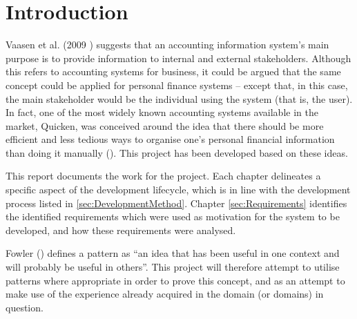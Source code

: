 \section{Introduction} \label{sec:Introduction}

Vaasen et al. (2009 \cite[cited][p.~8]{Boczko:2012:IAI:2331376}) suggests that
an accounting information system's main purpose is to provide information to
internal and external stakeholders. Although this refers to accounting systems
for business, it could be argued that the same concept could be applied for
personal finance systems -- except that, in this case, the main stakeholder
would be the individual using the system (that is, the user). In fact, one of
the most widely known accounting systems available in the market,
Quicken\texttrademark, was conceived around the idea that there should be more
efficient and less tedious ways to organise one's personal financial
information than doing it manually (\cite{quicken2017about}). This project has
been developed based on these ideas.

This report documents the work for the project. Each chapter delineates a
specific aspect of the development lifecycle, which is in line with the
development process listed in \ref{sec:DevelopmentMethod}. Chapter
\ref{sec:Requirements} identifies the identified requirements which were used
as motivation for the system to be developed, and how these requirements were
analysed.

Fowler (\citeyear[][Chapter~1,~Section~1.3]{fowler1997analysis}) defines a
pattern as ``an idea that has been useful in one context and will probably be
useful in others''. This project will therefore attempt to utilise patterns
where appropriate in order to prove this concept, and as an attempt to make use
of the experience already acquired in the domain (or domains) in question.
